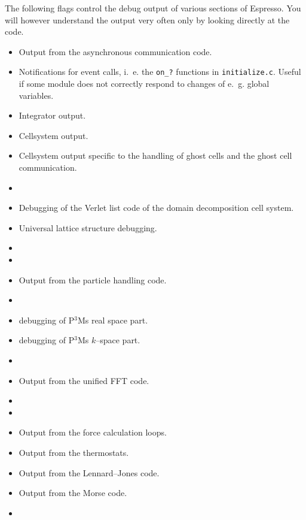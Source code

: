 The following flags control the debug output of various sections of
Espresso. You will however understand the output very often only by
looking directly at the code.
\begin{itemize}
\item {} Output from the asynchronous communication code.
\item {} Notifications for event calls, i.~e. the
  \texttt{on\_?} functions in \texttt{initialize.c}. Useful if some
  module does not correctly respond to changes of e.~g.  global
  variables.
\item {} Integrator output.
\item {} Cellsystem output.
\item {} Cellsystem output specific to the
  handling of ghost cells and the ghost cell communication.
\item {}
\item {} Debugging of the Verlet list code of the
  domain decomposition cell system.
\item {} Universal lattice structure debugging.
\item {}
\item {}
\item {} Output from the particle handling code.
\item {}
\item {} debugging of P$^3$Ms real space part.
\item {} debugging of P$^3$Ms $k$--space part.
\item {}
\item {} Output from the unified FFT code.
\item {}
\item {}
\item {} Output from the force calculation loops.
\item {} Output from the thermostats.
\item {} Output from the Lennard--Jones code.
\item {} Output from the Morse code.
\item {}

\end{itemize}
